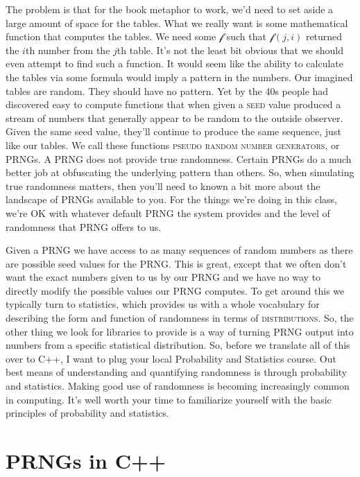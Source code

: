 \documentclass[]{tufte-handout}
\begin{document}
The problem is that for the book metaphor to work, we'd need to set aside a large amount of space for the tables. What we really want is some mathematical function that computes the tables. We need some $\mathcal{f}$ such that $\mathcal{f}(j,i)$ returned the $i$th number from the $j$th table. It's not the least bit obvious that we should even attempt to find such a function. It would seem like the ability to calculate the tables via some formula would imply a pattern in the numbers. Our imagined tables are random. They should have no pattern.  Yet by the 40s people had discovered easy to compute functions that when given a \textsc{seed} value produced a stream of numbers that generally appear to be random to the outside observer. Given the same seed value, they'll continue to produce the same sequence, just like our tables. We call these functions \textsc{pseudo random number generators}, or PRNGs.  A PRNG does not provide true randomness. Certain PRNGs do a much better job at obfuscating the underlying pattern than others.  So, when simulating true randomness matters, then you'll need to known a bit more about the landscape of PRNGs available to you. For the things we're doing in this class, we're OK with whatever default PRNG the system provides and the level of randomness that PRNG offers to us.

Given a PRNG we have access to as many sequences of random numbers as there are possible seed values for the PRNG\@. This is great, except that we often  don't want the exact numbers given to us by our PRNG and we have no way to directly modify the possible values our PRNG computes. To get around this we typically turn to statistics, which provides us with a whole vocabulary for describing the form and function of randomness in terms of \textsc{distributions}. So, the other thing we look for libraries to provide is a way of turning PRNG output into numbers from a specific statistical distribution. So, before we translate all of this over to C++, I want to plug your local Probability and Statistics course.  Out best means of understanding and quantifying randomness is through probability and statistics. Making good use of randomness is becoming increasingly common in computing. It's well worth your time to familiarize yourself with the basic principles of probability and statistics.

\section{PRNGs in C++}
\end{document}
